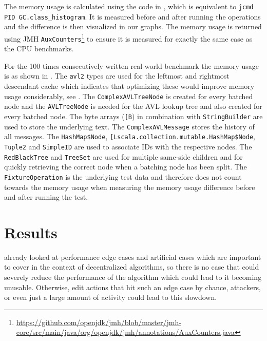 The memory usage is calculated using the code in , which is equivalent to \texttt{jcmd PID GC.class\_histogram}. It is measured before and after running the operations and the difference is then visualized in our graphs. The memory usage is returned using JMH \texttt{AuxCounters}\footnote{\url{https://github.com/openjdk/jmh/blob/master/jmh-core/src/main/java/org/openjdk/jmh/annotations/AuxCounters.java}} to ensure it is measured for exactly the same case as the CPU benchmarks.

For the 100 times consecutively written real-world benchmark the memory usage is as shown in . The \texttt{avl2} types are used for the leftmost and rightmost descendant cache which indicates that optimizing these would improve memory usage considerably, see . The \texttt{ComplexAVLTreeNode} is created for every batched node and the \texttt{AVLTreeNode} is needed for the AVL lookup tree and also created for every batched node. The byte arrays (\texttt{[B}) in combination with \texttt{StringBuilder} are used to store the underlying text. The \texttt{ComplexAVLMessage} stores the history of all messages. The \texttt{HashMap\$Node}, \texttt{[Lscala.collection.mutable.HashMap\$Node}, \texttt{Tuple2} and \texttt{SimpleID} are used to associate IDs with the respective nodes. The \texttt{RedBlackTree} and \texttt{TreeSet} are used for multiple same-side children and for quickly retrieving the correct node when a batching node has been split. The \texttt{FixtureOperation} is the underlying test data and therefore does not count towards the memory usage when measuring the memory usage difference before and after running the test.





\section{Results}

 already looked at performance edge cases and artificial cases which are important to cover in the context of decentralized algorithms, so there is no case that could severely reduce the performance of the algorithm which could lead to it becoming unusable. Otherwise, edit actions that hit such an edge case by chance, attackers, or even just a large amount of activity could lead to this slowdown.

